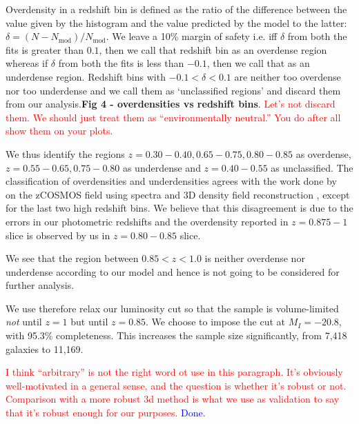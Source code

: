 \documentclass[twocolumn,useAMS,usenatbib]{mn2e}
\newcommand{\rachel}[1]{{\textcolor{red}{#1}}}
\newcommand{\arun}[1]{{\textcolor{blue}{#1}}}
\begin{document}
Overdensity in a redshift bin is defined as the ratio of the difference between the value given by the histogram and the value predicted by the model to the latter: $\delta=(N-N_{\text{mod}})/N_{\text{mod}}$. 
We leave a 10\% margin of safety i.e. iff $\delta$ from both the fits is greater than $0.1$, then we call that redshift bin as an
overdense region whereas if $\delta$ from both the fits is less than $-0.1$, then we call that as an underdense region. Redshift bins with $-0.1 < \delta < 0.1$ are neither too overdense
nor too underdense and we call them as `unclassified regions'  and discard them from our analysis.{\bf Fig 4 - overdensities vs redshift bins}.
\rachel{Let's not discard them.  We should just treat them as
  ``environmentally neutral.''  You do after all show them on your plots.}


We thus identify the regions $z=0.30-0.40, 0.65-0.75, 0.80-0.85$ as overdense, $z=0.55-0.65, 0.75-0.80$ as underdense and $z=0.40-0.55$ as unclassified.
The classification of overdensities and underdensities agrees with the work done by~\cite{Kovac_Density10k} on the zCOSMOS field using spectra and 3D density field reconstruction , except for the last two high redshift bins.
We believe that this disagreement is due to the errors in our photometric redshifts and the overdensity reported in $z=0.875-1$ slice
is observed by us in $z=0.80-0.85$ slice.

We see that the region between $0.85<z<1.0$ is neither overdense nor underdense according to our model and hence is not going to be considered for further analysis.

We use therefore relax our luminosity cut %
so that the sample is volume-limited \emph{not} until $z=1$ but until $z=0.85$. 
We choose to impose the cut at $M_I=-20.8$, with 95.3\% completeness. This increases the sample size significantly, from 7,418 galaxies to 11,169.

\rachel{I think ``arbitrary'' is not the right word ot use in this
  paragraph.  It's obviously well-motivated in a general sense, and
  the question is whether it's robust or not.  Comparison with a more
  robust 3d method is what we use as validation to say that it's
  robust enough for our purposes.}
\arun{Done.}
\end{document}
